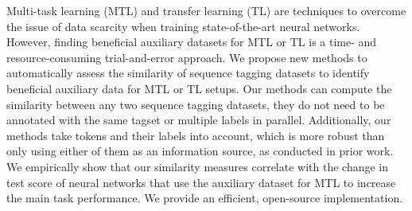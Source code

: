 Multi-task learning (MTL) and transfer learning (TL) are techniques to overcome the issue of data scarcity when training state-of-the-art neural networks. However, finding beneficial auxiliary datasets for MTL or TL is a time- and resource-consuming trial-and-error approach. We propose new methods to automatically assess the similarity of sequence tagging datasets to identify beneficial auxiliary data for MTL or TL setups. Our methods can compute the similarity between any two sequence tagging datasets, \ie they do not need to be annotated with the same tagset or multiple labels in parallel. Additionally, our methods take tokens and their labels into account, which is more robust than only using either of them as an information source, as conducted in prior work. We empirically show that our similarity measures correlate with the change in test score of neural networks that use the auxiliary dataset for MTL to increase the main task performance. We provide an efficient, open-source implementation.
